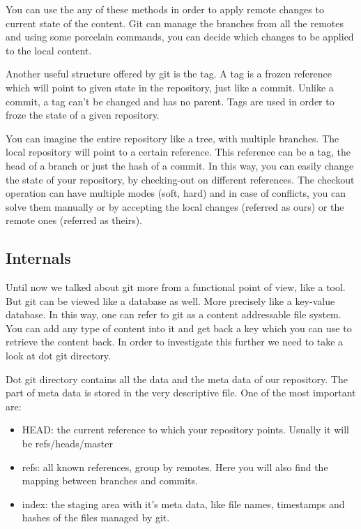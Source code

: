         You can use the any of these methods in order to apply remote changes to current state of the content. Git can manage the branches from all the remotes and using some porcelain commands, you can decide which changes to be applied to the local content.
        
        Another useful structure offered by git is the tag. A tag is a frozen reference which will point to given state in the repository, just like a commit. Unlike a commit, a tag can't be changed and has no parent. Tags are used in order to froze the state of a given repository. 
        
        You can imagine the entire repository like a tree, with multiple branches. The local repository will point to a certain reference. This reference can be a tag, the head of a branch or just the hash of a commit. In this way, you can easily change the state of your repository, by checking-out on different references. The checkout operation can have multiple modes (soft, hard) and in case of conflicts, you can solve them manually or by accepting the local changes (referred as ours) or the remote ones (referred as theirs).
        
    \subsection{Internals}
        Until now we talked about git more from a functional point of view, like a tool. But git can be viewed like a database as well. More precisely like a key-value database. In this way, one can refer to git as a content addressable file system. You can add any type of content into it and get back a key which you can use to retrieve the content back. In order to investigate this further we need to take a look at dot git directory.
        
        Dot git directory contains all the data and the meta data of our repository. The part of meta data is stored in the very descriptive file. One of the most important are:
        
        \begin{itemize}
            \item HEAD: the current reference to which your repository points. Usually it will be refs/heads/master
            \item refs: all known references, group by remotes. Here you will also find the mapping between branches and commits.
            \item index: the staging area with it's meta data, like file names, timestamps and hashes of the files managed by git.
        \end{itemize}
        

